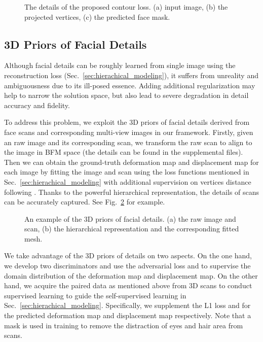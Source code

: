 \documentclass[10pt,twocolumn,letterpaper]{article}
\begin{document}
\begin{figure}[t]
  \centering
     \vspace{-10pt}
  \caption{The details of the proposed contour loss. (a) input image, (b) the projected vertices, (c) the predicted face mask.}
  \label{fig: contour_loss}
\end{figure} 

\subsection{3D Priors of Facial Details} \label{sec:3D_priors}

Although facial details can be roughly learned from single image using the reconstruction loss (Sec.~\ref{sec:hierachical_modeling}), it suffers from unreality and ambiguousness due to its ill-posed essence. Adding additional regularization may help to narrow the solution space, but also lead to severe degradation in detail accuracy and fidelity.
 
To address this problem, we exploit the 3D priors of facial details derived from face scans and corresponding multi-view images in our framework. Firstly, given an raw image and its corresponding scan, we transform the raw scan to align to the image in BFM space (the details can be found in the supplemental files). Then we can obtain the ground-truth deformation map and displacement map for each image by fitting the image and scan using the loss functions mentioned in Sec.~\ref{sec:hierachical_modeling} with additional supervision on vertices distance following\cite{amberg2007optimal} . Thanks to the powerful hierarchical representation, the details of scans can be accurately captured. See Fig.~\ref{fig: 3D_priors} for example. 



\begin{figure}[t]
  \centering
     \vspace{-5pt}
  \caption{An example of the 3D priors of facial details. (a) the raw image and scan, (b) the hierarchical representation and the corresponding fitted mesh.}
  \label{fig: 3D_priors}
  \vspace{-5pt}
\end{figure} 

We take advantage of the 3D priors of details on two aspects. On the one hand, we develop two discriminators and use the adversarial loss\cite{isola2017image}  and  to supervise the domain distribution of the deformation map and displacement map. On the other hand, we acquire the paired data as mentioned above from 3D scans to conduct supervised learning to guide the self-supervised learning in Sec.~\ref{sec:hierachical_modeling}. Specifically, we supplement the L1 loss  and  for the predicted deformation map and displacement map respectively. Note that a mask is used in training to remove the distraction of eyes and hair area from scans.
\end{document}
